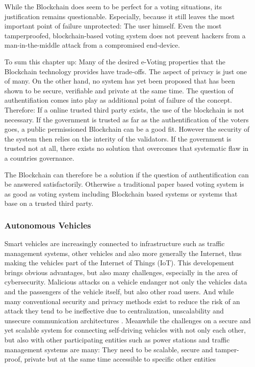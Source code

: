 While the Blockchain does seem to be perfect for a voting situations, its justification remains questionable. Especially, because it still leaves the most important point of failure unprotected: The user himself. Even the most tamperproofed, blockchain-based voting system does not prevent hackers from a man-in-the-middle attack from a compromised end-device. 

To sum this chapter up: Many of the desired e-Voting properties that the Blockchain technology provides have trade-offs. The aspect of privacy is just one of many. On the other hand, no system has yet been proposed that has been shown to be secure, verifiable and private at the same time. The question of authentifiation comes into play as additional point of failure of the concept.
Therefore: If a online trusted third party exists, the use of the blockchain is not necessary. If the government is trusted as far as the authentification of the voters goes, a public permissioned Blockchain can be a good fit. However the security of the system then relies on the interity of the validators. 
If the government is trusted not at all, there exists no solution that overcomes that systematic flaw in a countries governance.

The Blockchain can therefore be a solution if the question of authentification can be answered satisfactorily. Otherwise a traditional paper based voting system is as good as voting system including Blockchain based systems or systems that base on a trusted third party.

\subsubsection{Autonomous Vehicles}
Smart vehicles are increasingly connected to infrastructure such as traffic management systems, other vehicles and also more generally the Internet, thus making the vehicles part of the Internet of Things (IoT). This developement brings obvious advantages, but also many challenges, especially in the area of cybersecurity. Malicious attacks on a vehicle endanger not only the vehicles data and the passengers of the vehicle itself, but also other road users. And while many conventional security and privacy methods exist to reduce the risk of an attack they tend to be ineffective due to centralization, unscalability and unsecure communication architectures \cite{DorriSteger2017}.
Meanwhile the challenges on a secure and yet scalable system for connecting self-driving vehicles with not only each other, but also with other participating entities such as power stations and traffic management systems are many: They need to be scalable, secure and tamper-proof, private but at the same time accessible to specific other entities

